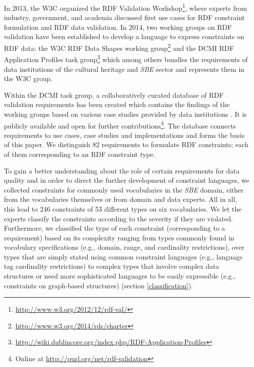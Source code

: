 \documentclass{llncs}
\begin{document}
In 2013, the W3C organized the RDF Validation Workshop\footnote{\url{http://www.w3.org/2012/12/rdf-val/}}, 
where experts from industry, government, and academia discussed first use cases for RDF constraint formulation and RDF data validation.
In 2014, two working groups on RDF validation have been established to develop a language to express constraints on RDF data: 
the W3C RDF Data Shapes working group\footnote{\url{http://www.w3.org/2014/rds/charter}} and the DCMI RDF Application Profiles task group\footnote{\url{http://wiki.dublincore.org/index.php/RDF-Application-Profiles}} which among others bundles the requirements of data institutions of the cultural heritage and \emph{SBE} sector and represents them in the W3C group. 

Within the DCMI task group, a collaboratively curated database of RDF validation requirements has been created which contains the findings of the working groups based on various case studies provided by data institutions \cite{BoschEckert2014}. It is publicly available and open for further contributions\footnote{Online at \url{http://purl.org/net/rdf-validation}}.
The database connects requirements to use cases, case studies and implementations and forms the basis of this paper. 
We distinguish 82 requirements to formulate RDF constraints; 
each of them corresponding to an RDF constraint type.

To gain a better understanding about the role of certain requirements for data quality and in order to direct the further development of constraint languages, we collected constraints for commonly used vocabularies in the \emph{SBE} domain, either from the vocabularies themselves or from domain and data experts. All in all, this lead to 246 constraints  of 53 different types on six vocabularies. 
We let the experts classify the constraints according to the severity if they are violated. Furthermore, we classified the type of each constraint (corresponding to a requirement) based on its complexity ranging from types commonly found in vocabulary specifications (e.g., domain, range, and cardinality restrictions), 
over types that are simply stated using common constraint languages (e.g., language tag cardinality restrictions) to complex types that involve complex data structures or need more sophisticated languages to be easily expressible 
(e.g., constraints on graph-based structures) (section \ref{classification}).
\end{document}
